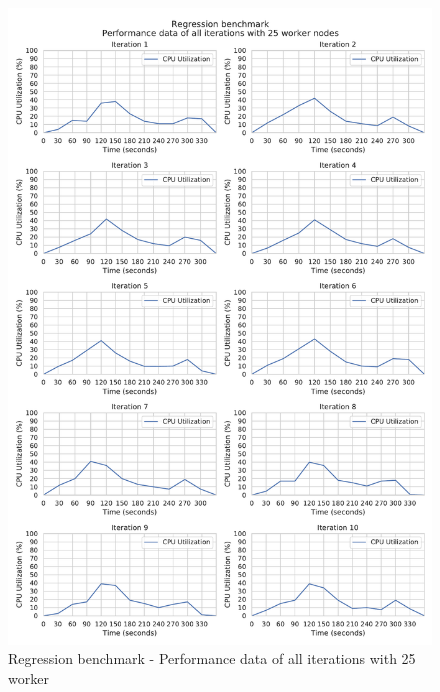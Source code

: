 \begin{figure}[h]
\centering
\includegraphics[scale=0.5]{images/appendix/evaluation_data/regression_benchmark/regression_25_worker_cpu_performance}
\caption{Regression benchmark - Performance data of all iterations with 25 worker}
\label{fig:appendix_eval_regression_static25}
\end{figure}

